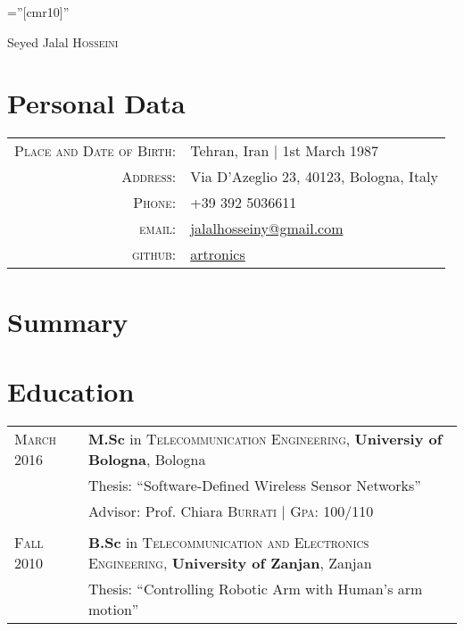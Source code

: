\documentclass[a4paper,10pt]{article}
\begin{document}
\pagestyle{empty} %

\font\fb=''[cmr10]'' %

\par{\centering
		{\Huge Seyed Jalal \textsc{Hosseini}
	}\bigskip\par}

\section{Personal Data}

\begin{tabular}{rl}
    \textsc{Place and Date of Birth:} & Tehran, Iran  | 1st March 1987 \\
    \textsc{Address:}   & Via D'Azeglio 23, 40123, Bologna, Italy \\
    \textsc{Phone:}     & +39 392 5036611\\
    \textsc{email:}     & \href{mailto:jalalhosseiny@gmail.com}{jalalhosseiny@gmail.com}\\
    \textsc{github:}     & \href{https://github.com/artronics}{artronics}
\end{tabular}

\section{Summary}


\section{Education}
\begin{tabularx}{\textwidth}{p{}|p{}}
	\textsc{March} 2016 & \textbf{M.Sc} in \textsc{Telecommunication Engineering}, \textbf{Universiy of Bologna}, Bologna\\
	& Thesis: ``Software-Defined Wireless Sensor Networks'' \\& \small Advisor: Prof. Chiara \textsc{Burrati} | \normalsize \textsc{Gpa}: 100/110\\\multicolumn{2}{c}{} \\
	\textsc{Fall} 2010& \textbf{B.Sc} in \textsc{Telecommunication and Electronics Engineering}, \normalsize\textbf{University of Zanjan}, Zanjan\\
	& Thesis: ``Controlling Robotic Arm with Human's arm motion''
\end{tabularx}
\end{document}
